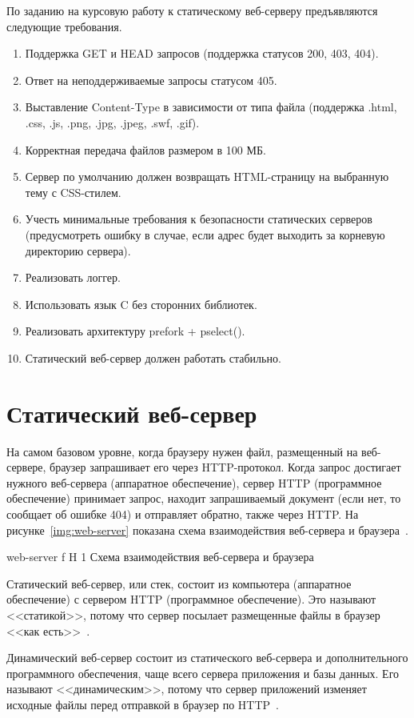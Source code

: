 \documentclass{bmstu}
\begin{document}
По заданию на курсовую работу к статическому веб-серверу предъявляются следующие требования.
\begin{enumerate}
\item Поддержка GET и HEAD запросов (поддержка статусов 200, 403, 404).
\item Ответ на неподдерживаемые запросы статусом 405.
\item Выставление Content-Type в зависимости от типа файла (поддержка .html, .css, .js, .png, .jpg, .jpeg, .swf, .gif).
\item Корректная передача файлов размером в 100 МБ.
\item Сервер по умолчанию должен возвращать HTML-страницу на выбранную тему с CSS-стилем.
\item Учесть минимальные требования к безопасности статических серверов (предусмотреть ошибку в случае, если адрес будет выходить за корневую директорию сервера).
\item Реализовать логгер.
\item Использовать язык C без сторонних библиотек.
\item Реализовать архитектуру prefork + pselect().
\item Статический веб-сервер должен работать стабильно.
\end{enumerate}

\section{Статический веб-сервер}

На самом базовом уровне, когда браузеру нужен файл, размещенный на веб-сервере, браузер запрашивает его через HTTP-протокол. 
Когда запрос достигает нужного веб-сервера (аппаратное обеспечение), сервер HTTP (программное обеспечение) принимает запрос, находит запрашиваемый документ (если нет, то сообщает об ошибке 404) и отправляет обратно, также через HTTP. 
На рисунке~\ref{img:web-server} показана схема взаимодействия веб-сервера и браузера~\cite{MdnWebServer2023}.

    {web-server}
    {f}
    {H}
    {1\textwidth}
    {Схема взаимодействия веб-сервера и браузера~\cite{MdnWebServer2023}}

Статический веб-сервер, или стек, состоит из компьютера (аппаратное обеспечение) с сервером HTTP (программное обеспечение). 
Это называют <<статикой>>, потому что сервер посылает размещенные файлы в браузер <<как есть>>~\cite{MdnWebServer2023}.

Динамический веб-сервер состоит из статического веб-сервера и дополнительного программного обеспечения, чаще всего сервера приложения и базы данных. 
Его называют <<динамическим>>, потому что сервер приложений изменяет исходные файлы перед отправкой в браузер по HTTP~\cite{MdnWebServer2023}.
\end{document}
